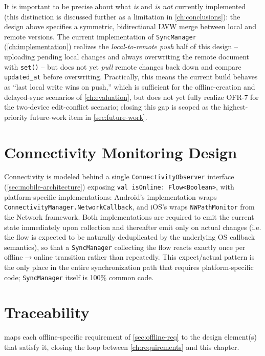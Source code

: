 It is important to be precise about what \emph{is} and \emph{is not}
currently implemented (this distinction is discussed further as a
limitation in \cref{ch:conclusions}): the design above specifies a
symmetric, bidirectional LWW merge between local and remote versions. The
current implementation of \texttt{SyncManager} (\cref{ch:implementation})
realizes the \emph{local-to-remote push} half of this design --
uploading pending local changes and always overwriting the remote
document with \texttt{set()} -- but does not yet \emph{pull} remote
changes back down and compare \texttt{updated\_at} before overwriting.
Practically, this means the current build behaves as \enquote{last local
write wins on push,} which is sufficient for the offline-creation and
delayed-sync scenarios of \cref{ch:evaluation}, but does not yet fully
realize OFR-7 for the two-device edit-conflict scenario; closing this gap
is scoped as the highest-priority future-work item in
\cref{sec:future-work}.

\section{Connectivity Monitoring Design}
\label{sec:connectivity-design}

Connectivity is modeled behind a single \texttt{ConnectivityObserver}
interface (\cref{sec:mobile-architecture}) exposing
\texttt{val isOnline: Flow<Boolean>}, with platform-specific
implementations: Android's implementation wraps
\texttt{ConnectivityManager.NetworkCallback}, and iOS's wraps
\texttt{NWPathMonitor} from the Network framework. Both implementations
are required to emit the current state immediately upon collection and
thereafter emit only on actual changes (i.e. the flow is expected to be
naturally deduplicated by the underlying OS callback semantics), so that a
\texttt{SyncManager} collecting the flow reacts exactly once per
offline$\to$online transition rather than repeatedly. This expect/actual
pattern is the only place in the entire synchronization path that requires
platform-specific code; \texttt{SyncManager} itself is 100\% common code.

\section{Traceability}
\label{sec:design-traceability}

 maps each offline-specific requirement of
\cref{sec:offline-req} to the design element(s) that satisfy it, closing
the loop between \cref{ch:requirements} and this chapter.

